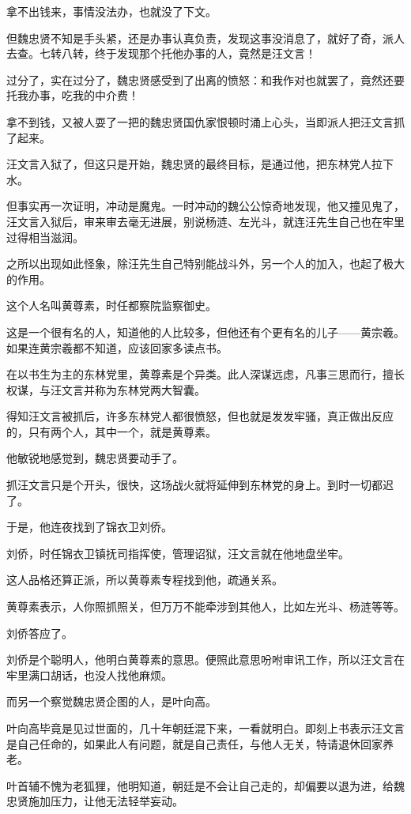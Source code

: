 \begin{multicols}{\theparacolNo}
		拿不出钱来，事情没法办，也就没了下文。

		但魏忠贤不知是手头紧，还是办事认真负责，发现这事没消息了，就好了奇，派人去查。七转八转，终于发现那个托他办事的人，竟然是汪文言！

		过分了，实在过分了，魏忠贤感受到了出离的愤怒：和我作对也就罢了，竟然还要托我办事，吃我的中介费！

		拿不到钱，又被人耍了一把的魏忠贤国仇家恨顿时涌上心头，当即派人把汪文言抓了起来。

		汪文言入狱了，但这只是开始，魏忠贤的最终目标，是通过他，把东林党人拉下水。

		但事实再一次证明，冲动是魔鬼。一时冲动的魏公公惊奇地发现，他又撞见鬼了，汪文言入狱后，审来审去毫无进展，别说杨涟、左光斗，就连汪先生自己也在牢里过得相当滋润。

		之所以出现如此怪象，除汪先生自己特别能战斗外，另一个人的加入，也起了极大的作用。

		这个人名叫黄尊素，时任都察院监察御史。

		这是一个很有名的人，知道他的人比较多，但他还有个更有名的儿子——黄宗羲。如果连黄宗羲都不知道，应该回家多读点书。

		在以书生为主的东林党里，黄尊素是个异类。此人深谋远虑，凡事三思而行，擅长权谋，与汪文言并称为东林党两大智囊。

		得知汪文言被抓后，许多东林党人都很愤怒，但也就是发发牢骚，真正做出反应的，只有两个人，其中一个，就是黄尊素。

		他敏锐地感觉到，魏忠贤要动手了。

		抓汪文言只是个开头，很快，这场战火就将延伸到东林党的身上。到时一切都迟了。

		于是，他连夜找到了锦衣卫刘侨。

		刘侨，时任锦衣卫镇抚司指挥使，管理诏狱，汪文言就在他地盘坐牢。

		这人品格还算正派，所以黄尊素专程找到他，疏通关系。

		黄尊素表示，人你照抓照关，但万万不能牵涉到其他人，比如左光斗、杨涟等等。

		刘侨答应了。

		刘侨是个聪明人，他明白黄尊素的意思。便照此意思吩咐审讯工作，所以汪文言在牢里满口胡话，也没人找他麻烦。

		而另一个察觉魏忠贤企图的人，是叶向高。

		叶向高毕竟是见过世面的，几十年朝廷混下来，一看就明白。即刻上书表示汪文言是自己任命的，如果此人有问题，就是自己责任，与他人无关，特请退休回家养老。

		叶首辅不愧为老狐狸，他明知道，朝廷是不会让自己走的，却偏要以退为进，给魏忠贤施加压力，让他无法轻举妄动。


\end{multicols}
